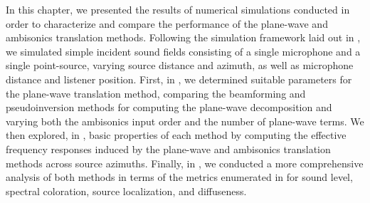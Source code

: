 In this chapter, we presented the results of numerical simulations conducted in order to characterize and compare the performance of the plane-wave and ambisonics translation methods.
Following the simulation framework laid out in , we simulated simple incident sound fields consisting of a single microphone and a single point-source, varying source distance and azimuth, as well as microphone distance and listener position.
First, in , we determined suitable parameters for the plane-wave translation method, comparing the beamforming and pseudoinversion methods for computing the plane-wave decomposition and varying both the ambisonics input order and the number of plane-wave terms.
We then explored, in , basic properties of each method by computing the effective frequency responses induced by the plane-wave and ambisonics translation methods across source azimuths.
Finally, in , we conducted a more comprehensive analysis of both methods in terms of the metrics enumerated in  for sound level, spectral coloration, source localization, and diffuseness.

